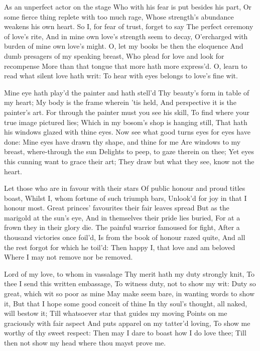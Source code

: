 \documentclass[twocolumn]{book}
\begin{document}
As an unperfect actor on the stage
Who with his fear is put besides his part,
Or some fierce thing replete with too much rage,
Whose strength's abundance weakens his own heart.
So I, for fear of trust, forget to say
The perfect ceremony of love's rite,
And in mine own love's strength seem to decay,
O'ercharged with burden of mine own love's might.
O, let my books be then the eloquence
\numerus*{}And dumb presagers of my speaking breast,
Who plead for love and look for recompense
More than that tongue that more hath more express'd.
  O, learn to read what silent love hath writ:
  To hear with eyes belongs to love's fine wit.


Mine eye hath play'd the painter and hath stell'd
Thy beauty's form in table of my heart;
My body is the frame wherein 'tis held,
And perspective it is the painter's art.
For through the painter must you see his skill,
To find where your true image pictured lies;
Which in my bosom's shop is hanging still,
That hath his windows glazed with thine eyes.
Now see what good turns eyes for eyes have done:
Mine eyes have drawn thy shape, and thine for me
Are windows to my breast, where-through the sun
Delights to peep, to gaze therein on thee;
  Yet eyes this cunning want to grace their art;
  They draw but what they see, know not the heart.


Let those who are in favour with their stars
Of public honour and proud titles boast,
Whilst I, whom fortune of such triumph bars,
Unlook'd for joy in that I honour most.
Great princes' favourites their fair leaves spread
But as the marigold at the sun's eye,
And in themselves their pride lies buried,
For at a frown they in their glory die.
The painful warrior famoused for fight,
After a thousand victories once foil'd,
Is from the book of honour razed quite,
And all the rest forgot for which he toil'd:
  Then happy I, that love and am beloved
  Where I may not remove nor be removed.


Lord of my love, to whom in vassalage
Thy merit hath my duty strongly knit,
To thee I send this written embassage,
To witness duty, not to show my wit:
Duty so great, which wit so poor as mine
May make seem bare, in wanting words to show it,
But that I hope some good conceit of thine
In thy soul's thought, all naked, will bestow it;
Till whatsoever star that guides my moving
Points on me graciously with fair aspect
And puts apparel on my tatter'd loving,
To show me worthy of thy sweet respect:
  Then may I dare to boast how I do love thee;
  Till then not show my head where thou mayst prove me.
\end{document}
